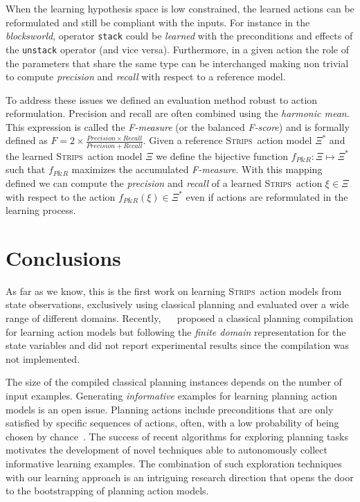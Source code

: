 \documentclass{article}
\newcommand{\strips}{\textsc{Strips}}     %
\begin{document}
When the learning hypothesis space is low constrained, the learned actions can be reformulated and still be compliant with the inputs. For instance in the {\em blocksworld}, operator {\small\tt stack} could be {\em learned} with the preconditions and effects of the {\small\tt unstack} operator (and vice versa). Furthermore, in a given action the role of the parameters that share the same type can be interchanged making non trivial to compute {\em precision} and {\em recall} with respect to a reference model.

To address these issues we defined an evaluation method robust to action reformulation. Precision and recall are often combined using the {\em harmonic mean}. This expression is called the {\em F-measure} (or the balanced {\em F-score}) and is formally defined as $F=2\times\frac{Precision\times Recall}{Precision+Recall}$. Given a reference \strips\ action model $\Xi^*$ and the learned \strips\ action model $\Xi$ we define the bijective function $f_{P\&R}:\Xi \mapsto \Xi^*$ such that $f_{P\&R}$ maximizes the accumulated {\em F-measure}. With this mapping defined we can compute the {\em precision} and {\em recall} of a learned \strips\ action $\xi\in\Xi$ with respect to the action $f_{P\&R}(\xi)\in \Xi^*$ even if actions are reformulated in the learning process.


\section{Conclusions}
As far as we know, this is the first work on learning \strips\ action models from state observations, exclusively using classical planning and evaluated over a wide range of different domains. Recently, ~\citeauthor{stern2017efficient}~\citeyear{stern2017efficient} proposed a classical planning compilation for learning action models but following the {\em finite domain} representation for the state variables and did not report experimental results since the compilation was not implemented.


The size of the compiled classical planning instances depends on the number of input examples. Generating {\em informative} examples for learning planning action models is an open issue. Planning actions include preconditions that are only satisfied by specific sequences of actions, often, with a low probability of being chosen by chance~\cite{fern2004learning}. The success of recent algorithms for exploring planning tasks~\cite{geffner:novelty:IJCAI17} motivates the development of novel techniques able to autonomously collect informative learning examples. The combination of such exploration techniques with our learning approach is an intriguing research direction that opens the door to the bootstrapping of planning action models.
\end{document}
